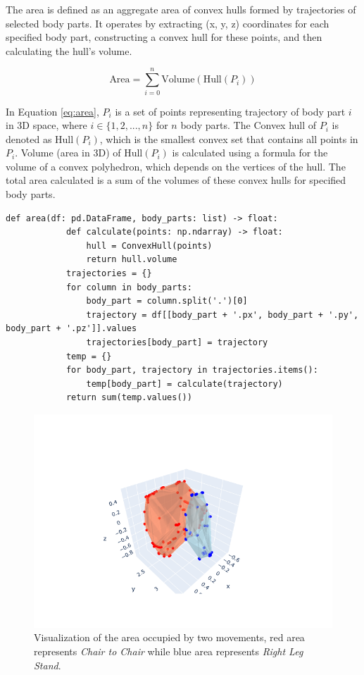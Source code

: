                 The area is defined as an aggregate area of convex hulls formed by trajectories of selected body parts. It operates by extracting (x, y, z) coordinates for each specified body part, constructing a convex hull for these points, and then calculating the hull's volume.

                \begin{equation}\label{eq:area}
                    \text{Area} = \sum_{i=0}^{n} \text{Volume}(\text{Hull}(P_i))
                \end{equation}
            
                In Equation \ref{eq:area}, $P_i$ is a set of points representing trajectory of body part $i$ in 3D space, where $i \in \{1, 2, ..., n\}$ for $n$ body parts. The Convex hull of $P_i$ is denoted as $\text{Hull}(P_i)$, which is the smallest convex set that contains all points in $P_i$. Volume (area in 3D) of $\text{Hull}(P_i)$ is calculated using a formula for the volume of a convex polyhedron, which depends on the vertices of the hull. The total area calculated is a sum of the volumes of these convex hulls for specified body parts.
                
        \begin{lstlisting}[caption={Area calculation method using ConvexHull class from SciPy library.}] 
        def area(df: pd.DataFrame, body_parts: list) -> float:
            def calculate(points: np.ndarray) -> float:
                hull = ConvexHull(points)
                return hull.volume
            trajectories = {}
            for column in body_parts:
                body_part = column.split('.')[0]
                trajectory = df[[body_part + '.px', body_part + '.py', body_part + '.pz']].values
                trajectories[body_part] = trajectory
            temp = {}
            for body_part, trajectory in trajectories.items():
                temp[body_part] = calculate(trajectory)
            return sum(temp.values())
        \end{lstlisting}

                \begin{figure}[H]
                    \centering
                    \includegraphics[width=.6\textwidth]{../src/resources/plots/feat-eng/area_difference.png}
                    \caption{
                        Visualization of the area occupied by two movements, red area represents \textit{Chair to Chair} while blue area represents \textit{Right Leg Stand}. 
                    }
                    \label{fig:area}
                \end{figure}
            
